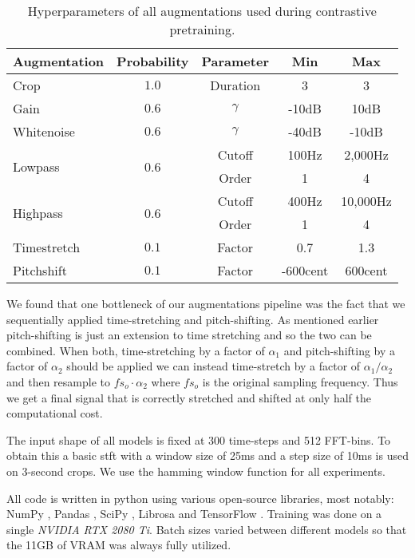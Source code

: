 \begin{table}[htpb]
  \centering
  \begin{tabular}{l c c c c}
    \toprule
        Augmentation & Probability & Parameter & Min & Max \\
        \midrule
        Crop & $1.0$ & Duration & 3 & 3 \\
        Gain & $0.6$ & $\gamma$ & -10dB & 10dB \\
        Whitenoise & $0.6$ & $\gamma$ & -40dB & -10dB \\
        \multirow{2}{*}{Lowpass} & \multirow{2}{*}{0.6} & Cutoff & 100Hz & 2,000Hz \\
        & & Order & 1 & 4 \\
        \multirow{2}{*}{Highpass} & \multirow{2}{*}{0.6} & Cutoff & 400Hz & 10,000Hz \\
        & & Order & 1 & 4 \\
        Timestretch & $0.1$ & Factor & 0.7 & 1.3 \\
        Pitchshift & $0.1$ & Factor & -600cent & 600cent \\
    \bottomrule
  \end{tabular}
  \caption[Augmentation hyperparameters]{Hyperparameters of all augmentations used during contrastive pretraining.}\label{tab:augmentations}
\end{table}

We found that one bottleneck of our augmentations pipeline was the fact that we sequentially applied time-stretching and pitch-shifting. As mentioned earlier pitch-shifting is just an extension to time stretching and so the two can be combined. When both, time-stretching by a factor of $\alpha_1$ and pitch-shifting by a factor of $\alpha_2$ should be applied we can instead time-stretch by a factor of $\alpha_1 / \alpha_2$ and then resample to $fs_o \cdot \alpha_2$ where $fs_o$ is the original sampling frequency. Thus we get a final signal that is correctly stretched and shifted at only half the computational cost.

The input shape of all models is fixed at 300 time-steps and 512 FFT-bins. To obtain this a basic \gls{stft} with a window size of 25ms and a step size of 10ms is used on 3-second crops. We use the hamming window function for all experiments.

All code is written in python using various open-source libraries, most notably: NumPy \cite{harris2020array}, Pandas \cite{reback2020pandas}, SciPy \cite{2020SciPy-NMeth}, Librosa \cite{mcfee2015librosa} and TensorFlow \cite{tensorflow2015-whitepaper}. Training was done on a single \textit{NVIDIA RTX 2080 Ti}. Batch sizes varied between different models so that the 11GB of VRAM was always fully utilized.

